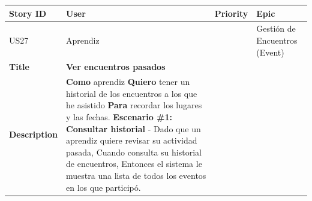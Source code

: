 {\def\LTcaptype{none} %
\begin{longtable}[]{@{}
  >{\raggedright\arraybackslash}p{}
  >{\raggedright\arraybackslash}p{}
  >{\raggedright\arraybackslash}p{}
  >{\raggedright\arraybackslash}p{}@{}}
\toprule\noalign{}
\begin{minipage}[b]{\linewidth}\raggedright
Story ID
\end{minipage} & \begin{minipage}[b]{\linewidth}\raggedright
User
\end{minipage} & \begin{minipage}[b]{\linewidth}\raggedright
Priority
\end{minipage} & \begin{minipage}[b]{\linewidth}\raggedright
Epic
\end{minipage} \\
\midrule\noalign{}
\endhead
\bottomrule\noalign{}
\endlastfoot
US27 & Aprendiz & 2 & Gestión de Encuentros (Event) \\
\textbf{Title} & \textbf{Ver encuentros pasados} & & \\
\textbf{Description} & \textbf{Como} aprendiz \textbf{Quiero} tener un
historial de los encuentros a los que he asistido \textbf{Para} recordar
los lugares y las fechas. \textbf{Escenario \#1: Consultar historial} -
Dado que un aprendiz quiere revisar su actividad pasada, Cuando consulta
su historial de encuentros, Entonces el sistema le muestra una lista de
todos los eventos en los que participó. & & \\
\end{longtable}
}

